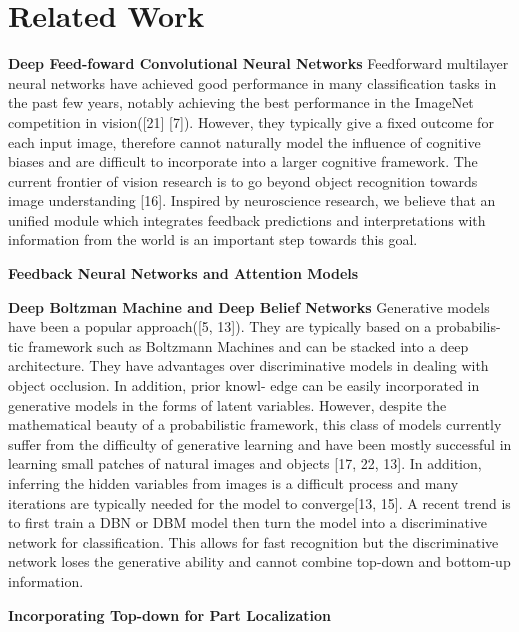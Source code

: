 \section{Related Work}
\label{sec:related_work}

\textbf{Deep Feed-foward Convolutional Neural Networks}
Feedforward multilayer neural networks have achieved good performance in many classification tasks in the past few years, notably achieving the best performance in the ImageNet competition in vision([21] [7]). However, they typically give a fixed outcome for each input image, therefore cannot naturally model the influence of cognitive biases and are difficult to incorporate into a larger cognitive framework. The current frontier of vision research is to go beyond object recognition towards image understanding [16]. Inspired by neuroscience research, we believe that an unified module which integrates feedback predictions and interpretations with information from the world is an important step towards this goal.

\textbf{Feedback Neural Networks and Attention Models}

\textbf{Deep Boltzman Machine and Deep Belief Networks}
Generative models have been a popular approach([5, 13]). They are typically based on a probabilis- tic framework such as Boltzmann Machines and can be stacked into a deep architecture. They have advantages over discriminative models in dealing with object occlusion. In addition, prior knowl- edge can be easily incorporated in generative models in the forms of latent variables. However, despite the mathematical beauty of a probabilistic framework, this class of models currently suffer from the difficulty of generative learning and have been mostly successful in learning small patches of natural images and objects [17, 22, 13]. In addition, inferring the hidden variables from images is a difficult process and many iterations are typically needed for the model to converge[13, 15]. A recent trend is to first train a DBN or DBM model then turn the model into a discriminative network for classification. This allows for fast recognition but the discriminative network loses the generative ability and cannot combine top-down and bottom-up information.

\textbf{Incorporating Top-down for Part Localization}

